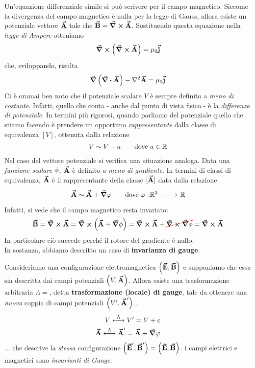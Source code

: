 Un'equazione differenziale simile si può scrivere per il campo magnetico.		Siccome la divergenza del campo magnetico è nulla per la legge di Gauss, allora esiste un potenziale vettore $\vb*{\va{A}}$ tale che $\vb*{\va{B}}=\curl{\vb*{\va{A}}}$. Sostituendo questa equazione nella \textit{legge di Ampère} otteniamo
\begin{equation*}
	\curl\left(\curl\vb*{\va{A}}\right)=\mu_0\vb*{\va{j}}
\end{equation*}
che, sviluppando, risulta
\begin{equation*}
	\grad \left( \div{\vba{A}}\right) - \laplacian{\vba{A}}=\mu_0 \vba j
\end{equation*}
Ci è oramai ben noto che il potenziale scalare $V$ è sempre definito a \textit{meno di costante}. Infatti, quello che conta - anche dal punto di vista fisico - è la \textit{differenza di potenziale}. In termini più rigorosi, quando parliamo del potenziale quello che stiamo facendo è prendere un opportuno \textit{rappresentante} dalla classe di equivalenza $\left[V\right]$, ottenuta dalla relazione
\begin{align*}
	V\sim V+a \qquad \text{dove}\ a\in\mathbb{R}
\end{align*}
Nel caso del vettore potenziale si verifica una situazione analoga. Data una \textit{funzione scalare} $\oldphi$, $\vb*{\va{A}}$ è definito \textit{a meno di gradiente}. In termini di classi di equivalenza, $\vb*{\va{A}}$ è il rappresentante della classe $[\vb*{\va{A}}]$ data dalla relazione
\begin{align*}
	\vba{A}\sim \vba{A}+\grad{\phi} \qquad \text{dove}\ \funz[\phi]{\realset^3}{\realset}
\end{align*}
Infatti, si vede che il campo magnetico resta invariato:
\begin{equation*}
	\vba{B}=\curl\vba{A}=\curl \left( \vba{A}+\grad\oldphi\right)= \curl \vba{A} + \Ccancel[red]{\curl\grad\oldphi}=\curl\vba{A}		
\end{equation*}
In particolare ciò succede perché il rotore del gradiente è nullo.\\
In sostanza, abbiamo descritto un caso di \textbf{invarianza di gauge}.
\begin{define}
	Consideriamo una configurazione elettromagnetica $\left(\vb*{\va{E}},\vb*{\va{B}}\right)$ e supponiamo che essa sia descritta dai campi potenziali $\left(V,\vb*{\va{A}}\right)$. Allora esiste una trasformazione arbitraria $\Lambda=$, detta \textbf{trasformazione (locale) di gauge}, tale da ottenere una \textit{nuova} coppia di campi potenziali $\left(V',\vb*{\va{A}}'\right)$...
	\begin{align*}
		V\overset{\Lambda}{\longleftrightarrow} V'=V+c\\
		\vb*{\va{A}}\overset{\Lambda}{\longleftrightarrow} \vb*{\va{A}}'=\vb*{\va{A}}+\grad{\varphi}\\
	\end{align*}
	... che descrive la \textit{stessa} configurazione $\left(\vb*{\va{E}}',\vb*{\va{B}}'\right)=\left(\vb*{\va{E}},\vb*{\va{B}}\right)$. i campi elettrici e magnetici sono \textit{invarianti di Gauge}.
\end{define}
